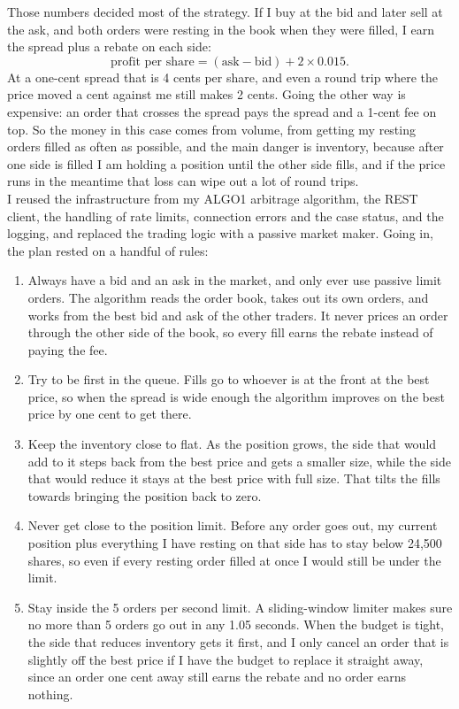 \documentclass{article}
\begin{document}
\noindent Those numbers decided most of the strategy. If I buy at the bid and later sell at the ask, and both orders were resting in the book when they were filled, I earn the spread plus a rebate on each side:
\begin{equation}
\text{profit per share} = (\text{ask} - \text{bid}) + 2 \times 0.015 .
\end{equation}
At a one-cent spread that is 4 cents per share, and even a round trip where the price moved a cent against me still makes 2 cents. Going the other way is expensive: an order that crosses the spread pays the spread and a 1-cent fee on top. So the money in this case comes from volume, from getting my resting orders filled as often as possible, and the main danger is inventory, because after one side is filled I am holding a position until the other side fills, and if the price runs in the meantime that loss can wipe out a lot of round trips.\\

\noindent I reused the infrastructure from my ALGO1 arbitrage algorithm, the REST client, the handling of rate limits, connection errors and the case status, and the logging, and replaced the trading logic with a passive market maker. Going in, the plan rested on a handful of rules:
\begin{enumerate}
  \item Always have a bid and an ask in the market, and only ever use passive limit orders. The algorithm reads the order book, takes out its own orders, and works from the best bid and ask of the other traders. It never prices an order through the other side of the book, so every fill earns the rebate instead of paying the fee.
  \item Try to be first in the queue. Fills go to whoever is at the front at the best price, so when the spread is wide enough the algorithm improves on the best price by one cent to get there.
  \item Keep the inventory close to flat. As the position grows, the side that would add to it steps back from the best price and gets a smaller size, while the side that would reduce it stays at the best price with full size. That tilts the fills towards bringing the position back to zero.
  \item Never get close to the position limit. Before any order goes out, my current position plus everything I have resting on that side has to stay below 24{,}500 shares, so even if every resting order filled at once I would still be under the limit.
  \item Stay inside the 5 orders per second limit. A sliding-window limiter makes sure no more than 5 orders go out in any 1.05 seconds. When the budget is tight, the side that reduces inventory gets it first, and I only cancel an order that is slightly off the best price if I have the budget to replace it straight away, since an order one cent away still earns the rebate and no order earns nothing.
\end{enumerate}
\end{document}
